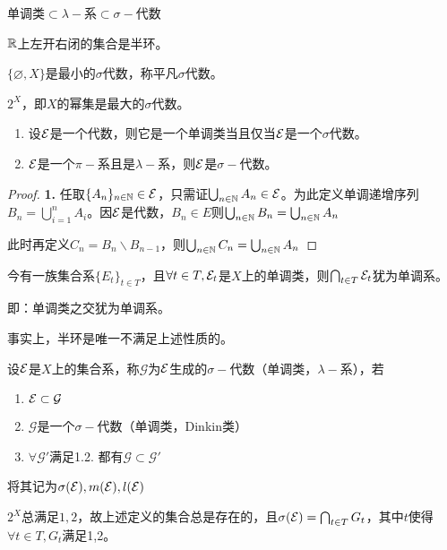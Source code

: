\documentclass{ctexbook}
\begin{document}
单调类$\subset \lambda-$系$\subset\sigma-$代数
\begin{Eg}
  $\mathbb{R}$上左开右闭的集合是半环。%
\end{Eg}

\begin{Eg}
  $\{\varnothing,X\}$是最小的$\sigma$代数，称平凡$\sigma$代数。
\end{Eg}
\begin{Eg}
  $2^{X}$，即$X$的幂集是最大的$\sigma$代数。
\end{Eg}

\begin{Prop}
  \begin{enumerate}
  \item  设$\mathcal{E}$是一个代数，则它是一个单调类当且仅当$\mathcal{E}$是一个$\sigma$代数。
  \item $\mathcal{E}$是一个$\pi-$系且是$\lambda-$系，则$\mathcal{E}$是$\sigma-$代数。
  \end{enumerate}
 \end{Prop}

 \begin{proof}
   \textbf{1.} 任取$\{A_{n}\}_{n\in\mathbb{N}}\in \mathcal{E}$，只需证$\bigcup_{n\in\mathbb{N}} A_{n}\in \mathcal{E}$。为此定义单调递增序列$B_{n}=\bigcup_{i=1}^{n}A_{i}$。因$\mathcal{E}$是代数，$B_{n}\in E$则$\bigcup_{n\in\mathbb{N}}B_{n}=\bigcup_{n\in \mathbb{N}}A_{n}$

   此时再定义$C_{n}=B_{n}\backslash B_{n-1}$，则$\bigcup_{n\in\mathbb{N}}C_{n}=\bigcup_{n\in\mathbb{N}}A_{n}$
 \end{proof}

 \begin{Rmk}
   今有一族集合系$\{E_{t}\}_{t\in T}$，且$\forall t\in T, \mathcal{E}_{t}$是$X$上的单调类，则$\bigcap_{t\in T}\mathcal{E}_{t}$犹为单调系。
 \end{Rmk}
即：单调类之交犹为单调系。
 
事实上，半环是唯一不满足上述性质的。

\begin{Def}
  设$\mathcal{E}$是$X$上的集合系，称$\mathcal{G}$为$\mathcal{E}$生成的$\sigma-$代数（单调类，$\lambda-$系），若
  \begin{enumerate}
  \item $\mathcal{E}\subset \mathcal{G}$
  \item $\mathcal{G}$是一个$\sigma-$代数（单调类，Dinkin类）
  \item $\forall \mathcal{G}'$满足1.2. 都有$\mathcal{G}\subset\mathcal{G}'$
  \end{enumerate}
  将其记为$\sigma(\mathcal{E}),m(\mathcal{E}),l(\mathcal{E})$
\end{Def}
$2^{X}$总满足$1,2$，故上述定义的集合总是存在的，且$\sigma(\mathcal{E})=\bigcap_{t\in T}G_{t}$，其中$t$使得$\forall t\in T, G_{t}$满足1,2。
\end{document}
